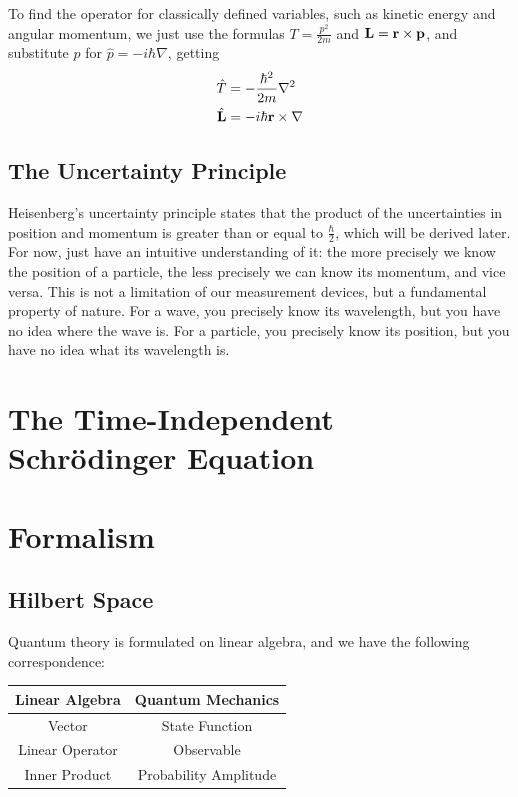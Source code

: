 \documentclass[a4paper,12pt]{article}
\begin{document}
To find the operator for classically defined variables, such as kinetic energy and angular momentum, we just use the formulas $T = \frac{p^2}{2m}$ and $\bf{L} = \bf{r} \times \bf{p}$, and substitute $p$ for $\hat{p} = -i \hbar \nabla$, getting
\begin{align*}
  \hat{T} &= -\frac{\hbar^2}{2m} \nabla^2\\
  \hat{\bf{L}} &= -i \hbar \bf{r} \times \nabla
\end{align*}
\subsection{The Uncertainty Principle}
Heisenberg's uncertainty principle states that the product of the uncertainties in position and momentum is greater than or equal to $\frac{\hbar}{2}$, which will be derived later.
For now, just have an intuitive understanding of it: the more precisely we know the position of a particle, the less precisely we can know its momentum, and vice versa. This is not a limitation of our measurement devices, but a fundamental property of nature.
For a wave, you precisely know its wavelength, but you have no idea where the wave is. For a particle, you precisely know its position, but you have no idea what its wavelength is. 

\pagebreak

\section{The Time-Independent Schr\"odinger Equation}
\pagebreak

\section{Formalism}
\subsection{Hilbert Space}
Quantum theory is formulated on linear algebra, and we have the following correspondence:

\begin{table}[h]
    \centering
    \begin{tabular}{c|c}
        \textbf{Linear Algebra} & \textbf{Quantum Mechanics} \\
        \hline
        Vector & State Function \\
        Linear Operator & Observable \\
        Inner Product & Probability Amplitude \\
    \end{tabular}
\end{table}
\end{document}
